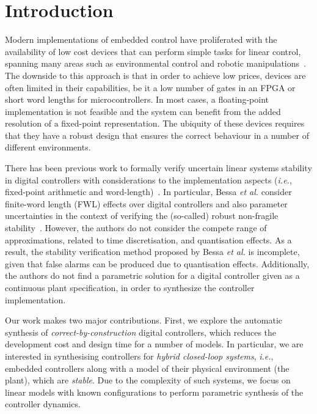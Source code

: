 \documentclass{sig-alternate-05-2015}
\begin{document}
%
%
\printccsdesc



\section{Introduction}

Modern implementations of embedded control have proliferated with the
availability of low cost devices that can perform simple tasks for linear
control, spanning many areas such as environmental control and robotic
manipulations~\cite{astrom1997computer,Franklin15}.  The downside to this
approach is that in order to achieve low prices, devices are often limited
in their capabilities, be it a low number of gates in an FPGA or short word
lengths for microcontrollers.  In most cases, a floating-point implementation
is not feasible and the system can benefit from the added resolution of a
fixed-point representation.  The ubiquity of these devices requires that
they have a robust design that ensures the correct behaviour in a number of
different environments.
%

There has been previous work to formally verify uncertain linear systems
stability in digital controllers with considerations to the implementation
aspects ({\it i.e.}, fixed-point arithmetic and word-length)~\cite{Bessa16}. 
In particular, Bessa {\it et al.} consider finite-word length (FWL) effects
over digital controllers and also parameter uncertainties in the context of
verifying the (so-called) robust non-fragile
stability~\cite{bhattacharyya97}.  However, the authors do not consider the
compete range of approximations, related to time discretisation, and
quantisation effects.  As a result, the stability verification method
proposed by Bessa {\it et al.} is incomplete, given that false alarms can be
produced due to quantisation effects.  Additionally, the authors do not
find a parametric solution for a digital controller given as a continuous
plant specification, in order to synthesize the controller implementation.

Our work makes two major contributions. First, we explore the automatic synthesis 
of {\em correct-by-construction} digital controllers, which reduces the development
cost and design time for a number of models.  In particular, we are
interested in synthesising controllers for {\em hybrid closed-loop systems},
{\it i.e.}, embedded controllers along with a model of their physical
environment (the plant), which are {\em stable}.  Due to the complexity of
such systems, we focus on linear models with known configurations to perform
parametric synthesis of the controller dynamics.
\end{document}
